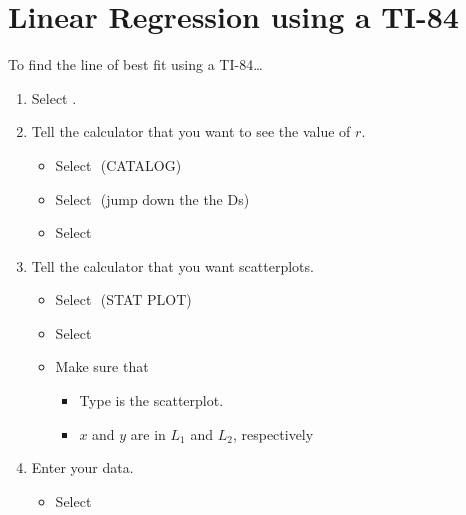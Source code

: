 \section{Linear Regression using a {TI-84}}

\begin{myConcept}{To find the line of best fit using a {\scshape TI-84}\dots}
    \begin{enumerate}[]
        \item Select . 
        \item Tell the calculator that you want to see the value of $r$.
            \begin{itemize}
                \item Select 
                    \,\,{\footnotesize\ttfamily (CATALOG)}
                \item Select 
                    \,\,{\footnotesize (jump down the the Ds)}
                \item Select 
            \end{itemize}
        \item Tell the calculator that you want scatterplots.
            \begin{itemize}
                \item Select 
                    \,\,{\footnotesize\ttfamily (STAT PLOT)}
                \item Select 
                \item Make sure that 
                    \begin{itemize} 
                        \item {\ttfamily Type} is the scatterplot.
                        \item $x$ and $y$ are in $L_1$ and $L_2$, respectively 
                    \end{itemize}
            \end{itemize}
        \item Enter your data.
            \begin{itemize}
                \item Select 

\end{itemize}
\end{enumerate}
\end{myConcept}
